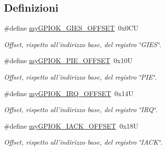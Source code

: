 \subsection*{Definizioni}
\begin{DoxyCompactItemize}
\item 
\#define \hyperlink{group__my_g_p_i_o_k__t_ga0da2526ca3cd1a94ebcecf96778ea2e5}{my\+G\+P\+I\+O\+K\+\_\+\+G\+I\+E\+S\+\_\+\+O\+F\+F\+S\+E\+T}~0x0\+C\+U
\begin{DoxyCompactList}\small\item\em Offset, rispetto all'indirizzo base, del registro \char`\"{}\+G\+I\+E\+S\char`\"{}. \end{DoxyCompactList}\item 
\#define \hyperlink{group__my_g_p_i_o_k__t_ga2ed7646e6f910f5803477e51b7fe26e3}{my\+G\+P\+I\+O\+K\+\_\+\+P\+I\+E\+\_\+\+O\+F\+F\+S\+E\+T}~0x10\+U
\begin{DoxyCompactList}\small\item\em Offset, rispetto all'indirizzo base, del registro \char`\"{}\+P\+I\+E\char`\"{}. \end{DoxyCompactList}\item 
\#define \hyperlink{group__my_g_p_i_o_k__t_ga37ee502d1ba364dfde9261c4f7a537a6}{my\+G\+P\+I\+O\+K\+\_\+\+I\+R\+Q\+\_\+\+O\+F\+F\+S\+E\+T}~0x14\+U
\begin{DoxyCompactList}\small\item\em Offset, rispetto all'indirizzo base, del registro \char`\"{}\+I\+R\+Q\char`\"{}. \end{DoxyCompactList}\item 
\#define \hyperlink{group__my_g_p_i_o_k__t_gac72408c288009c213c0231973b3fe761}{my\+G\+P\+I\+O\+K\+\_\+\+I\+A\+C\+K\+\_\+\+O\+F\+F\+S\+E\+T}~0x18\+U
\begin{DoxyCompactList}\small\item\em Offset, rispetto all'indirizzo base, del registro \char`\"{}\+I\+A\+C\+K\char`\"{}. \end{DoxyCompactList}\end{DoxyCompactItemize}
